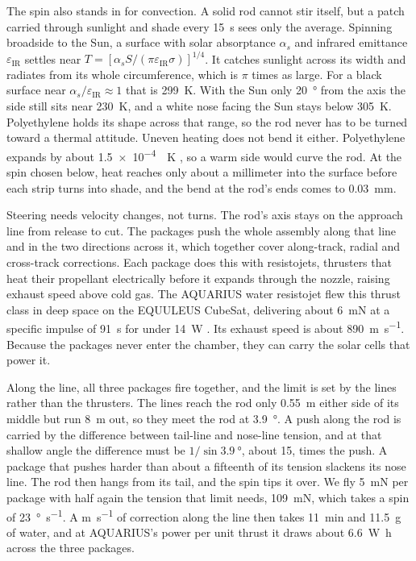\documentclass{article}
\begin{document}
The spin also stands in for convection. A solid rod cannot stir itself, but a patch carried through sunlight and shade every \SI{15}{\second} sees only the average. Spinning broadside to the Sun, a surface with solar absorptance $\alpha_s$ and infrared emittance $\varepsilon_\mathrm{IR}$ settles near $T=[\alpha_s S/(\pi\varepsilon_\mathrm{IR}\sigma)]^{1/4}$. It catches sunlight across its width and radiates from its whole circumference, which is $\pi$ times as large. For a black surface near $\alpha_s/\varepsilon_\mathrm{IR}\approx1$ \cite{gilmore2002spacecraft} that is \SI{299}{\kelvin}. With the Sun only \SI{20}{\degree} from the axis the side still sits near \SI{230}{\kelvin}, and a white nose facing the Sun stays below \SI{305}{\kelvin}. Polyethylene holds its shape across that range, so the rod never has to be turned toward a thermal attitude. Uneven heating does not bend it either. Polyethylene expands by about \SI{1.5e-4}{\per\kelvin} \cite{crc_handbook}, so a warm side would curve the rod. At the spin chosen below, heat reaches only about a millimeter into the surface before each strip turns into shade, and the bend at the rod's ends comes to \SI{0.03}{\milli\meter}.

Steering needs velocity changes, not turns. The rod's axis stays on the approach line from release to cut. The packages push the whole assembly along that line and in the two directions across it, which together cover along-track, radial and cross-track corrections. Each package does this with resistojets, thrusters that heat their propellant electrically before it expands through the nozzle, raising exhaust speed above cold gas. The AQUARIUS water resistojet flew this thrust class in deep space on the EQUULEUS CubeSat, delivering about \SI{6}{\milli\newton} at a specific impulse of \SI{91}{\second} for under \SI{14}{\watt} \cite{sekine2024aquarius}. Its exhaust speed is about \SI{890}{\meter\per\second}. Because the packages never enter the chamber, they can carry the solar cells that power it.

Along the line, all three packages fire together, and the limit is set by the lines rather than the thrusters. The lines reach the rod only \SI{0.55}{\meter} either side of its middle but run \SI{8}{\meter} out, so they meet the rod at \SI{3.9}{\degree}. A push along the rod is carried by the difference between tail-line and nose-line tension, and at that shallow angle the difference must be $1/\sin\SI{3.9}{\degree}$, about 15, times the push. A package that pushes harder than about a fifteenth of its tension slackens its nose line. The rod then hangs from its tail, and the spin tips it over. We fly \SI{5}{\milli\newton} per package with half again the tension that limit needs, \SI{109}{\milli\newton}, which takes a spin of \SI{23}{\degree\per\second}. A \si{\meter\per\second} of correction along the line then takes \SI{11}{\minute} and \SI{11.5}{\gram} of water, and at AQUARIUS's power per unit thrust it draws about \SI{6.6}{\watt\hour} across the three packages.
\end{document}
